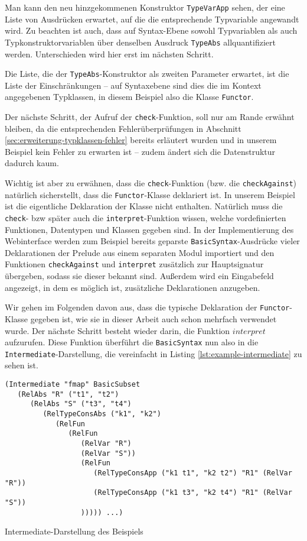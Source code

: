 Man kann den neu hinzgekommenen Konstruktor \texttt{TypeVarApp} sehen, der eine Liste von Ausdrücken erwartet, auf
die die entsprechende Typvariable angewandt wird. Zu beachten ist auch, dass auf Syntax-Ebene sowohl Typvariablen als auch
Typkonstruktorvariablen über denselben Ausdruck \texttt{TypeAbs} allquantifiziert werden. Unterschieden wird hier erst im
nächsten Schritt.

Die Liste, die der \texttt{TypeAbs}-Konstruktor als zweiten Parameter erwartet, ist die Liste der Einschränkungen -- auf Syntaxebene
sind dies die im Kontext angegebenen Typklassen, in diesem Beispiel also die Klasse \texttt{Functor}.

Der nächste Schritt, der Aufruf der \texttt{check}-Funktion, soll nur am Rande erwähnt bleiben, da die entsprechenden
Fehlerüberprüfungen in Abschnitt \ref{sec:erweiterung-typklassen-fehler} bereits erläutert wurden und in unserem Beispiel
kein Fehler zu erwarten ist -- zudem ändert sich die Datenstruktur dadurch kaum.

Wichtig ist aber zu erwähnen, dass die \texttt{check}-Funktion (bzw. die \texttt{checkAgainst}) natürlich sicherstellt, dass die
\texttt{Functor}-Klasse deklariert ist.
In unserem Beispiel ist die eigentliche Deklaration der Klasse nicht enthalten. Natürlich muss die \texttt{check}- bzw später
auch die \texttt{interpret}-Funktion wissen, welche vordefinierten Funktionen,
Datentypen und Klassen gegeben sind. In der Implementierung des Webinterface \cite{freetheoremswebui} werden zum Beispiel bereits
geparste \texttt{BasicSyntax}-Ausdrücke vieler Deklarationen der Prelude aus einem separaten Modul importiert und den
Funktionen \texttt{checkAgainst} und \texttt{interpret} zusätzlich zur Hauptsignatur übergeben, sodass sie dieser bekannt sind.
Außerdem wird ein Eingabefeld angezeigt, in dem es möglich ist, zusätzliche Deklarationen anzugeben.

Wir gehen im Folgenden davon aus, dass die typische Deklaration der \texttt{Functor}-Klasse gegeben ist, wie sie in dieser
Arbeit auch schon mehrfach verwendet wurde. Der nächste Schritt besteht wieder darin, die Funktion $interpret$ aufzurufen. 
Diese Funktion überführt die \texttt{BasicSyntax} nun also in die \texttt{Intermediate}-Darstellung, die vereinfacht in Listing
\ref{lst:example-intermediate} zu sehen ist.

\begin{listing}[ht]
\begin{verbatim}
(Intermediate "fmap" BasicSubset
   (RelAbs "R" ("t1", "t2")
      (RelAbs "S" ("t3", "t4")
         (RelTypeConsAbs ("k1", "k2")
            (RelFun
               (RelFun
                  (RelVar "R")
                  (RelVar "S"))
                  (RelFun
                     (RelTypeConsApp ("k1 t1", "k2 t2") "R1" (RelVar "R"))
                     (RelTypeConsApp ("k1 t3", "k2 t4") "R1" (RelVar "S"))
                  ))))) ...)
\end{verbatim}
\caption{Intermediate-Darstellung des Beispiels}
\label{lst:example-intermediate}
\end{listing}

